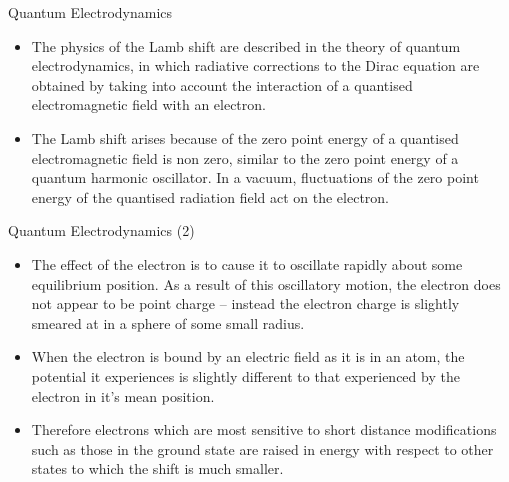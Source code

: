 \documentclass[aspectratio=1610,xcolor=dvipsnames,t]{beamer}
\begin{document}
    \begin{frame}{Quantum Electrodynamics}
        \begin{itemize} 
        \item The physics of the Lamb shift are described in the theory of quantum electrodynamics,
    in which radiative corrections to the Dirac equation are obtained by taking into
    account the interaction of a quantised electromagnetic field with an electron.

    \item The Lamb shift arises because of the zero point energy of a quantised electromagnetic
    field is non zero, similar to the zero point energy of a quantum harmonic oscillator.
    In a vacuum, fluctuations of the zero point energy of the quantised radiation field
    act on the electron. 
    \end{itemize} 
\end{frame} 

    \begin{frame}{Quantum Electrodynamics (2)} 
    \begin{itemize}     
    \item The effect of the electron is to cause it to oscillate rapidly
    about some equilibrium position. As a result of this oscillatory motion, the electron
    does not appear to be point charge -- instead the electron charge is slightly smeared
    at in a sphere of some small radius. 
    
    \item When the electron is bound by an electric field
    as it is in an atom, the potential it experiences is slightly different to that 
    experienced by the electron in it's mean position. 
    
    \item Therefore electrons which are
    most sensitive to short distance modifications such as those in the ground state
    are raised in energy with respect to other states to which the shift is much smaller.
        \end{itemize} 
    \end{frame} 
\end{document}
